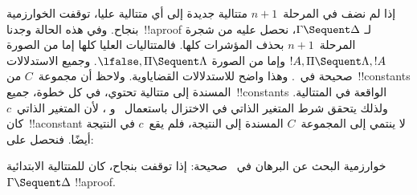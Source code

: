 \documentclass[../../../include/open-logic-section]{subfiles}
\begin{document}
إذا لم نضف في المرحلة~$n+1$ متتالية جديدة إلى أي متتالية عليا، توقفت
الخوارزمية بنجاح. وفي هذه الحالة وجدنا~!!a{proof} لـ
$\Gamma\Sequent\Delta$، نحصل عليه من شجرة المرحلة~$n+1$ بحذف المؤشرات
كلها. فالمتتاليات العليا كلها إما من الصورة
$!A,\Pi\Sequent\Lambda,!A$ وإما من الصورة
$\lfalse,\Pi\Sequent\Lambda$. وجميع الاستدلالات صحيحة في~.
وهذا واضح للاستدلالات القضاياوية. ولاحظ أن مجموعة~$C$ من~!!{constant}s المسندة إلى متتالية
تحتوي، في كل خطوة، جميع~!!{constant}s الواقعة في المتتالية. ولذلك يتحقق
شرط المتغير الذاتي في الاختزال باستعمال~\LeftR{\lexists} و
\RightR{\lforall}، لأن المتغير الذاتي~$c$ كان~!!a{constant} لا ينتمي إلى
المجموعة~$C$ المسندة إلى النتيجة، فلم يقع~$c$ في النتيجة أيضًا. فنحصل على:

\begin{prop}
خوارزمية البحث عن البرهان في~ صحيحة: إذا توقفت بنجاح، كان
للمتتالية الابتدائية~$\Gamma\Sequent\Delta$ !!a{proof}.
\end{prop}
\end{document}
